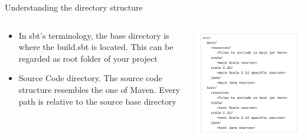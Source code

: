 \documentclass[presentation, aspectratio=169]{beamer}
\begin{document}
\begin{frame}[label={sec:orga4be23b}]{Understanding the directory structure}
\begin{columns}
\begin{column}{0.45\columnwidth}
\begin{itemize}
\item In sbt's terminology, the base directory is where the build.sbt is located.
This can be regarded as root folder of your project
\item Source Code directory. The source code structure resembles the one of Maven. 
Every path is relative to the source base directory
\end{itemize}
\end{column}

\begin{column}{0.45\columnwidth}
\begin{center}
\includegraphics[width=.9\linewidth]{./img/dir-structure.png}
\end{center}
\end{column}
\end{columns}
\end{frame}
\end{document}
